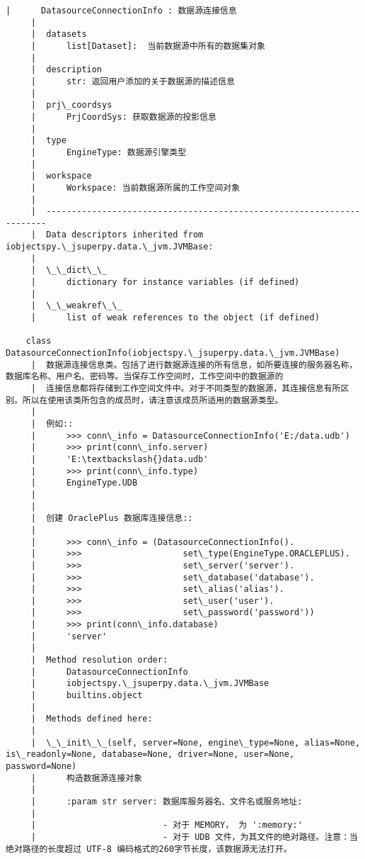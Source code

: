 \documentclass[11pt]{article}
\begin{document}
\begin{Verbatim}[commandchars=\\\{\}]
     |      DatasourceConnectionInfo : 数据源连接信息
     |  
     |  datasets
     |      list[Dataset]:  当前数据源中所有的数据集对象
     |  
     |  description
     |      str: 返回用户添加的关于数据源的描述信息
     |  
     |  prj\_coordsys
     |      PrjCoordSys: 获取数据源的投影信息
     |  
     |  type
     |      EngineType: 数据源引擎类型
     |  
     |  workspace
     |      Workspace: 当前数据源所属的工作空间对象
     |  
     |  ----------------------------------------------------------------------
     |  Data descriptors inherited from iobjectspy.\_jsuperpy.data.\_jvm.JVMBase:
     |  
     |  \_\_dict\_\_
     |      dictionary for instance variables (if defined)
     |  
     |  \_\_weakref\_\_
     |      list of weak references to the object (if defined)
    
    class DatasourceConnectionInfo(iobjectspy.\_jsuperpy.data.\_jvm.JVMBase)
     |  数据源连接信息类。包括了进行数据源连接的所有信息，如所要连接的服务器名称，数据库名称、用户名、密码等。当保存工作空间时，工作空间中的数据源的
     |  连接信息都将存储到工作空间文件中。对于不同类型的数据源，其连接信息有所区别。所以在使用该类所包含的成员时，请注意该成员所适用的数据源类型。
     |  
     |  例如::
     |      >>> conn\_info = DatasourceConnectionInfo('E:/data.udb')
     |      >>> print(conn\_info.server)
     |      'E:\textbackslash{}data.udb'
     |      >>> print(conn\_info.type)
     |      EngineType.UDB
     |  
     |  
     |  创建 OraclePlus 数据库连接信息::
     |  
     |      >>> conn\_info = (DatasourceConnectionInfo().
     |      >>>                    set\_type(EngineType.ORACLEPLUS).
     |      >>>                    set\_server('server').
     |      >>>                    set\_database('database').
     |      >>>                    set\_alias('alias').
     |      >>>                    set\_user('user').
     |      >>>                    set\_password('password'))
     |      >>> print(conn\_info.database)
     |      'server'
     |  
     |  Method resolution order:
     |      DatasourceConnectionInfo
     |      iobjectspy.\_jsuperpy.data.\_jvm.JVMBase
     |      builtins.object
     |  
     |  Methods defined here:
     |  
     |  \_\_init\_\_(self, server=None, engine\_type=None, alias=None, is\_readonly=None, database=None, driver=None, user=None, password=None)
     |      构造数据源连接对象
     |      
     |      :param str server: 数据库服务器名、文件名或服务地址:
     |      
     |                         - 对于 MEMORY， 为 ':memory:'
     |                         - 对于 UDB 文件，为其文件的绝对路径。注意：当绝对路径的长度超过 UTF-8 编码格式的260字节长度，该数据源无法打开。

\end{Verbatim}
\end{document}
